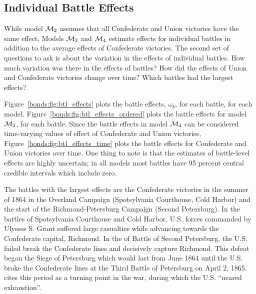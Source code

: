 \subsection{Individual Battle Effects}
\label{sec:indiv-effects-battl}

While model $\mathcal{M}_{\text{2}}$ assumes that all Confederate and Union victories have the same effect, Models $\mathcal{M}_{\text{3}}$ and $\mathcal{M}_{\text{4}}$ estimate effects for individual battles in addition to the average effects of Confederate victories.
The second set of questions to ask is about the variation in the effects of individual battles.
How much variation was there in the effects of battles? 
How did the  effects of Union and Confederate victories change over time?
Which battles had the largest effects? 

Figure~\ref{bonds:fig:btl_effects} plots the battle effects, $\omega_{b}$, for each battle, for each model.
Figure~\ref{bonds:fig:btl_effects_ordered} plots the battle effects for model $\mathcal{M}_{\text{3}}$, for each battle.
Since the battle effects in model $\mathcal{M}_{\text{4}}$ can be considered time-varying values of effect of Confederate and Union victories, Figure~\ref{bonds:fig:btl_effects_time} plots the battle effects for Confederate and Union victories over time. 
One thing to note is that the estimates of battle-level effects are highly uncertain; in all models most battles have 95 percent central credible intervals which include zero.

The battles with the largest effects are the Confederate victories in the summer of 1864 in the Overland Campaign (Spotsylvania Courthouse, Cold Harbor) and the start of the Richmond-Petersburg Campaign (Second Petersburg).
In the battles of Spotsylvania Courthouse and Cold Harbor, U.S. forces commanded by Ulysses S. Grant suffered large casualties while advancing towards the Confederate capital, Richmond.
In the of Battle of Second Petersburg, the U.S. failed break the Confederate lines and decisively capture Richmond.
This defeat began the Siege of Petersburg which would last from June 1864 until the U.S. broke the Confederate lines at the Third Battle of Petersburg on April 2, 1865.
\textcite[151-152]{Reiter2009} cites this period as a turning point in the war, during which the U.S. ``neared exhaustion''.

